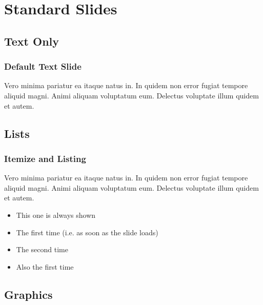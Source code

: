 
\section{Standard Slides}

\subsection{Text Only}

\begin{frame}
	\frametitle{Default Text Slide}
	Vero minima pariatur ea itaque natus in. In quidem non error fugiat tempore aliquid magni. Animi aliquam voluptatum eum. Delectus voluptate illum quidem et autem.
\end{frame}

\subsection{Lists}

\begin{frame}
	\frametitle{Itemize and Listing}
	Vero minima pariatur ea itaque natus in. In quidem non error fugiat tempore aliquid magni. Animi aliquam voluptatum eum.
	\pause
	 Delectus voluptate illum quidem et autem.

	\begin{itemize}[<+->]
		\item This one is always shown
		\item The first time (i.e. as soon as the slide loads)
		\item The second time
		\item Also the first time
	\end{itemize}
\end{frame}

\subsection{Graphics}


